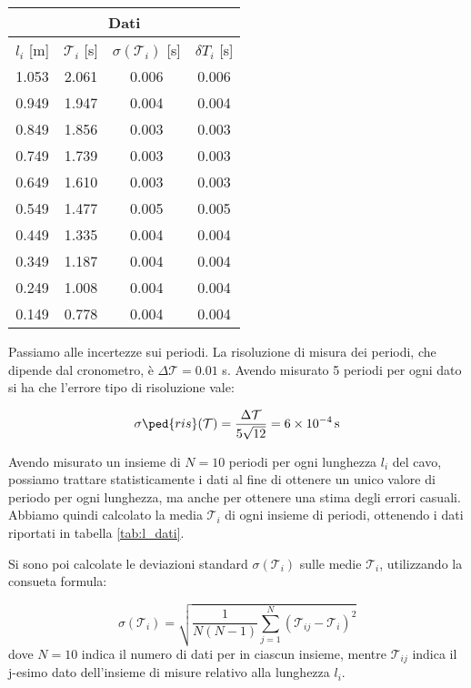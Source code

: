 \begin{SCtable}
    \centering
    \begin{tabular}{c c c c}
        \multicolumn{4}{c}{\textbf{Dati}} \\
        \toprule
        $l_i$ [m] & $\mathcal{T}_i$ [s] & $\sigma(\mathcal{T}_i)$ [s] & $\delta T_i$ [s] \\
        \midrule
        1.053 & 2.061 & 0.006 & 0.006 \\
        0.949 & 1.947 & 0.004 & 0.004 \\
        0.849 & 1.856 & 0.003 & 0.003 \\
        0.749 & 1.739 & 0.003 & 0.003 \\
        0.649 & 1.610 & 0.003 & 0.003 \\
        0.549 & 1.477 & 0.005 & 0.005 \\
        0.449 & 1.335 & 0.004 & 0.004 \\
        0.349 & 1.187 & 0.004 & 0.004 \\
        0.249 & 1.008 & 0.004 & 0.004 \\
        0.149 & 0.778 & 0.004 & 0.004 \\
        \bottomrule
    \end{tabular}
    \caption{}
    \label{tab:l_dati}
\end{SCtable}

Passiamo alle incertezze sui periodi. La risoluzione di misura dei periodi, che dipende dal cronometro, è
$\Delta \mathcal{T} = 0.01$ s. Avendo misurato 5 periodi per ogni dato si ha che l'errore tipo di risoluzione vale:

\begin{equation}
	\sigma\ped{ris}(\mathcal{T}) = \frac{\Delta \mathcal{T}}{5\sqrt{12}} = \SI{6e-4}{s}
\end{equation}

Avendo misurato un insieme di $N = 10$ periodi per ogni lunghezza $l_i$ del cavo, possiamo trattare statisticamente i dati
al fine di ottenere un unico valore di periodo per ogni lunghezza, ma anche per ottenere una stima degli errori casuali.
Abbiamo quindi calcolato la media $\mathcal{T}_i$ di ogni insieme di periodi, ottenendo i dati riportati in tabella \ref{tab:l_dati}.

Si sono poi calcolate le deviazioni standard $\sigma(\mathcal{T}_i)$ sulle medie $\mathcal{T}_i$, utilizzando la consueta formula:

\begin{equation}
	\sigma(\mathcal{T}_i) = \sqrt{\frac{1}{N(N - 1)}\sum_{j=1}^N (\mathcal{T}_{ij} - \mathcal{T}_i)^2}
\end{equation}
%
dove $N = 10$ indica il numero di dati per in ciascun insieme, mentre $\mathcal{T}_{ij}$ indica il j-esimo dato dell'insieme di misure
relativo alla lunghezza $l_i$.

